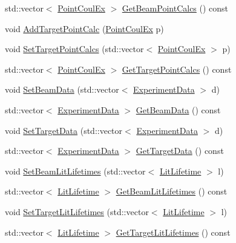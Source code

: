 \begin{DoxyCompactItemize}
\item 
std\-::vector$<$ \hyperlink{classPointCoulEx}{Point\-Coul\-Ex} $>$ \hyperlink{classCoulExSimFitter_a83cf4799996faac7fee012a797d14d68}{Get\-Beam\-Point\-Calcs} () const 
\item 
void \hyperlink{classCoulExSimFitter_a256b37098b33f916f4c5f4eec14cf477}{Add\-Target\-Point\-Calc} (\hyperlink{classPointCoulEx}{Point\-Coul\-Ex} p)
\item 
void \hyperlink{classCoulExSimFitter_a83fed4de27046f0f8cfaff70c824c763}{Set\-Target\-Point\-Calcs} (std\-::vector$<$ \hyperlink{classPointCoulEx}{Point\-Coul\-Ex} $>$ p)
\item 
std\-::vector$<$ \hyperlink{classPointCoulEx}{Point\-Coul\-Ex} $>$ \hyperlink{classCoulExSimFitter_aa15df5dc8fafe7ad453006e3e25eb627}{Get\-Target\-Point\-Calcs} () const 
\item 
void \hyperlink{classCoulExSimFitter_a59ebba363d2aba7df840ed47cdbb8aa2}{Set\-Beam\-Data} (std\-::vector$<$ \hyperlink{classExperimentData}{Experiment\-Data} $>$ d)
\item 
std\-::vector$<$ \hyperlink{classExperimentData}{Experiment\-Data} $>$ \hyperlink{classCoulExSimFitter_a6b6c20a2ad583d4683b319fe95fecb61}{Get\-Beam\-Data} () const 
\item 
void \hyperlink{classCoulExSimFitter_aec8080c3f8a0edbce8400a6eaf935bb1}{Set\-Target\-Data} (std\-::vector$<$ \hyperlink{classExperimentData}{Experiment\-Data} $>$ d)
\item 
std\-::vector$<$ \hyperlink{classExperimentData}{Experiment\-Data} $>$ \hyperlink{classCoulExSimFitter_a555360856a255d85185a9af58d4ea9d0}{Get\-Target\-Data} () const 
\item 
void \hyperlink{classCoulExSimFitter_a5fd88c4d7e5f06ed956e4729f74a6cdc}{Set\-Beam\-Lit\-Lifetimes} (std\-::vector$<$ \hyperlink{classLitLifetime}{Lit\-Lifetime} $>$ l)
\item 
std\-::vector$<$ \hyperlink{classLitLifetime}{Lit\-Lifetime} $>$ \hyperlink{classCoulExSimFitter_aae5fb8ff0de05e1cf93ae3a6fd28f04e}{Get\-Beam\-Lit\-Lifetimes} () const 
\item 
void \hyperlink{classCoulExSimFitter_a9a3619c2164f23b35e484774eb115b9e}{Set\-Target\-Lit\-Lifetimes} (std\-::vector$<$ \hyperlink{classLitLifetime}{Lit\-Lifetime} $>$ l)
\item 
std\-::vector$<$ \hyperlink{classLitLifetime}{Lit\-Lifetime} $>$ \hyperlink{classCoulExSimFitter_ab24c12957304e58e370056e17fd2d63f}{Get\-Target\-Lit\-Lifetimes} () const 
\item 

\end{DoxyCompactItemize}

